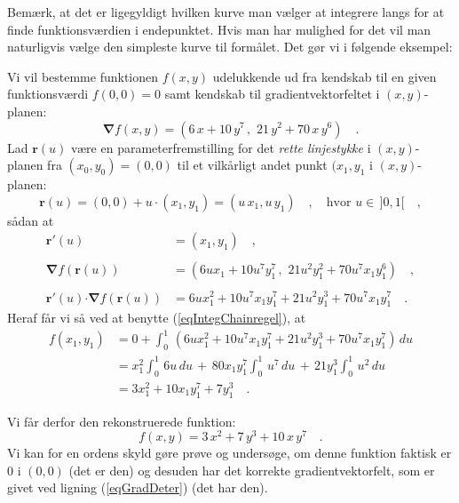 Bemærk, at det er ligegyldigt hvilken kurve man vælger at integrere langs for at finde funktionsværdien i endepunktet. Hvis man har mulighed for det vil man naturligvis vælge den simpleste kurve til formålet. Det gør vi i  følgende eksempel:

\begin{example}
Vi vil bestemme funktionen $f(x,y)$ udelukkende ud fra kendskab til en given funktionsværdi $f(0,0) = 0$ samt kendskab til gradientvektorfeltet  i $(x,y)$-planen:
\begin{equation}\label{eqGradDeter}
{\bm{\nabla}}f(x,y) = (6\,x +  10\,y^{7}\, , \,\, 21\,y^{2} + 70\,x\,y^{6} ) \quad .
\end{equation}
Lad $\mathbf{r}(u)$ være en parameterfremstilling for det \emph{rette linjestykke} i $(x,y)$-planen fra $(x_{0}, y_{0})= (0,0)$ til et vilkårligt andet punkt $(x_{1}, y_{1}$ i $(x,y)$-planen:
\begin{equation}
\mathbf{r}(u) = (0,0) + u\cdot(x_{1}, y_{1}) = (u\,x_{1}, u\,y_{1}) \quad , \quad \textrm{hvor $u \in \, ]0,1[$} \quad ,
\end{equation}
sådan at
\begin{equation}
\begin{aligned}
\mathbf{r}'(u) &= (x_{1}, y_{1}) \quad , \\ \\
{\bm{\nabla}}f(\mathbf{r}(u)) &= (6ux_{1} + 10u^{7}y_{1}^{7}\, , \,\, 21u^{2}y_{1}^{2} + 70u^{7}x_{1}y_{1}^{6}) \quad , \\ \\
\mathbf{r}'(u) {\bm{\cdot}} {\bm{\nabla}}f(\mathbf{r}(u)) &= 6ux_{1}^{2} + 10u^{7}x_{1}y_{1}^{7} + 21u^{2}y_{1}^{3} + 70u^{7}x_{1}y_{1}^{7}  \quad .
\end{aligned}
\end{equation}
Heraf får vi så ved at benytte (\ref{eqIntegChainregel}), at
\begin{equation}
\begin{aligned}
f(x_{1}, y_{1}) &= 0 + \int_{0}^{1} \, \left( 6ux_{1}^{2} + 10u^{7}x_{1}y_{1}^{7} + 21u^{2}y_{1}^{3} + 70u^{7}x_{1}y_{1}^{7}\right) \, du \\
&= x_{1}^{2}\int_{0}^{1}\,6u \, du \, + \, 80x_{1}y_{1}^{7}\int_{0}^{1}\,u^{7} \, du \, + \, 21y_{1}^{3}\int_{0}^{1}\,u^{2} \, du \\
&= 3x_{1}^{2} + 10x_{1}y_{1}^{7}+ 7y_{1}^{3} \quad .
\end{aligned}
\end{equation}

Vi får derfor den rekonstruerede funktion:
\begin{equation}
f(x,y) = 3\,x^{2} + 7\,y^{3} + 10\,x\,y^{7} \quad .
\end{equation}
Vi kan  for en ordens skyld gøre prøve og undersøge, om denne funktion faktisk er $0$ i $(0,0)$ (det er den) og desuden har det korrekte gradientvektorfelt, som er givet ved ligning (\ref{eqGradDeter}) (det har den).
\end{example}

